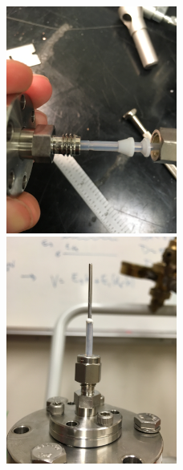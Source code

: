 \begin{figure}[htbp]
\includegraphics[width=0.5\textwidth, angle=-90]{figures/testbed/ft5_1.jpg}
\includegraphics[width=0.5\textwidth, angle=-90]{figures/testbed/ft5_2.jpg}\\      
    

\end{figure}

